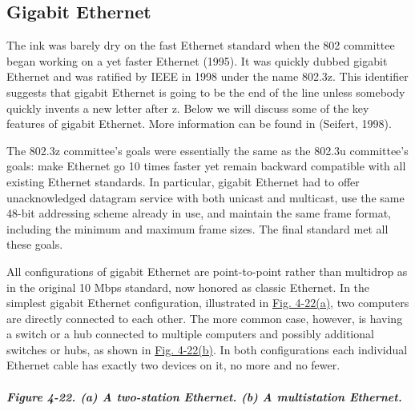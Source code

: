 \documentclass[b5paper,11pt]{memoir}
\begin{document}
\subsection{Gigabit Ethernet}

The ink was barely dry on the fast Ethernet standard when the 802
committee began working on a yet faster Ethernet (1995). It was quickly
dubbed {gigabit Ethernet} and was ratified by IEEE in 1998 under the
name 802.3z. This identifier suggests that gigabit Ethernet is going to
be the end of the line unless somebody quickly invents a new letter
after z. Below we will discuss some of the key features of gigabit
Ethernet. More information can be found in (Seifert, 1998).

The 802.3z committee's goals were essentially the same as the 802.3u
committee's goals: make Ethernet go 10 times faster yet remain backward
compatible with all existing Ethernet standards. In particular, gigabit
Ethernet had to offer unacknowledged datagram service with both unicast
and multicast, use the same 48-bit addressing scheme already in use, and
maintain the same frame format, including the minimum and maximum frame
sizes. The final standard met all these goals.

All configurations of gigabit Ethernet are point-to-point rather than
multidrop as in the original 10 Mbps standard, now honored as {classic
Ethernet}. In the simplest gigabit Ethernet configuration, illustrated
in
\protect\hyperlink{0130661023_ch04lev1sec3.htmlux5cux23ch04fig22}{Fig.
4-22(a)}, two computers are directly connected to each other. The more
common case, however, is having a switch or a hub connected to multiple
computers and possibly additional switches or hubs, as shown in
\protect\hyperlink{0130661023_ch04lev1sec3.htmlux5cux23ch04fig22}{Fig.
4-22(b)}. In both configurations each individual Ethernet cable has
exactly two devices on it, no more and no fewer.

\subparagraph[Figure 4-22. (a) A two-station Ethernet. (b) A
multistation
Ethernet.]{\texorpdfstring{\protect\hypertarget{0130661023_ch04lev1sec3.htmlux5cux23ch04fig22}{}{}Figure
4-22. (a) A two-station Ethernet. (b) A multistation
Ethernet.}{Figure 4-22. (a) A two-station Ethernet. (b) A multistation Ethernet.}}

\end{document}
